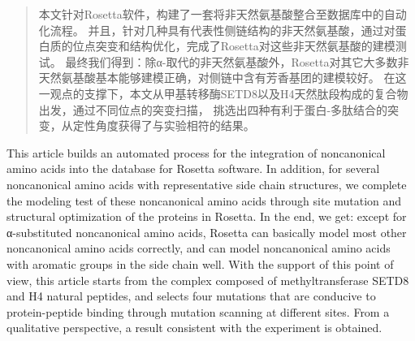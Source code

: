 

\begin{abstract}
  本文针对Rosetta软件，构建了一套将非天然氨基酸整合至数据库中的自动化流程。
  并且，针对几种具有代表性侧链结构的非天然氨基酸，通过对蛋白质的位点突变和结构优化，完成了Rosetta对这些非天然氨基酸的建模测试。
  最终我们得到：除α-取代的非天然氨基酸外，Rosetta对其它大多数非天然氨基酸基本能够建模正确，对侧链中含有芳香基团的建模较好。
  在这一观点的支撑下，本文从甲基转移酶SETD8以及H4天然肽段构成的复合物出发，通过不同位点的突变扫描，
  挑选出四种有利于蛋白-多肽结合的突变，从定性角度获得了与实验相符的结果。

\end{abstract}

\begin{abstract*}
  This article builds an automated process for the integration of noncanonical amino acids into the database for Rosetta software.
  In addition, for several noncanonical amino acids with representative side chain structures, we complete the modeling test of these noncanonical amino acids through site mutation and structural optimization of the proteins in Rosetta.
  In the end, we get: except for α-substituted noncanonical amino acids, Rosetta can basically model most other noncanonical amino acids correctly, and can model noncanonical amino acids with aromatic groups in the side chain well.
  With the support of this point of view, this article starts from the complex composed of methyltransferase SETD8 and H4 natural peptides, and selects four mutations that are conducive to protein-peptide binding through mutation scanning at different sites.
  From a qualitative perspective, a result consistent with the experiment is obtained.

\end{abstract*}
